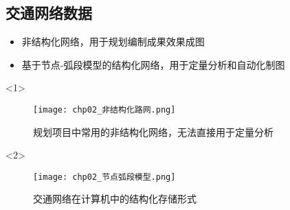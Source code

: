 \subsection{交通网络数据}
\begin{frame}[t]{\subsecname}
\begin{itemize}
\item<1-> 非结构化网络，用于规划编制成果效果成图
\item<2-> 基于节点-弧段模型的结构化网络，用于定量分析和自动化制图
\end{itemize}

\begin{overlayarea}{\textwidth}{\textheight}
  \begin{onlyenv}<1>
\begin{figure}
  \centering
  \texttt{[image: chp02\_非结构化路网.png]}
  \caption{规划项目中常用的非结构化网络，无法直接用于定量分析}
\end{figure}
  \end{onlyenv}

  \begin{onlyenv}<2>
\begin{figure}\centering
   \texttt{[image: chp02\_节点弧段模型.png]}

\caption{交通网络在计算机中的结构化存储形式}
\end{figure}
  \end{onlyenv}
\end{overlayarea}
\end{frame}

